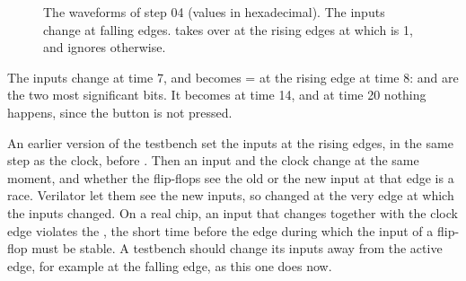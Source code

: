\begin{figure}[ht]
\centering
{}
\caption{The waveforms of step 04 (values in hexadecimal). The inputs change
at falling edges.  takes over  at the rising edges at
which  is 1, and ignores  otherwise.}
\label{fig:step04-waves}
\end{figure}

The inputs change at time 7, and  becomes  =
 at the rising edge at time 8:  and  are the two
most significant bits. It becomes  at time 14, and at time 20 nothing
happens, since the button is not pressed.

\begin{pitfall}
An earlier version of the testbench set the inputs at the rising edges, in
the same step as the clock, before . Then an input and the clock
change at the same moment, and whether the flip-flops see the old or the new
input at that edge is a race. Verilator let them see the new inputs, so
 changed at the very edge at which the inputs changed. On a real
chip, an input that changes together with the clock edge violates the
, the short time before the edge during which the input of a
flip-flop must be stable. A testbench should change its inputs away from the
active edge, for example at the falling edge, as this one does now.
\end{pitfall}

